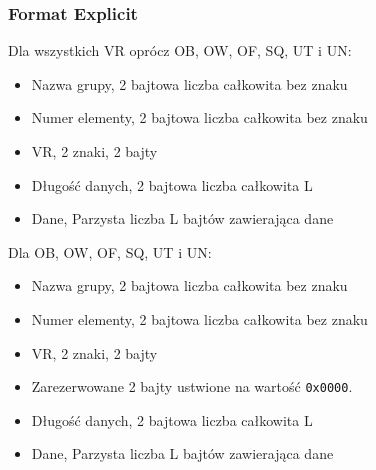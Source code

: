 \documentclass{beamer}
\begin{document}
\begin{frame}[allowframebreaks]
  \frametitle{Format Explicit}

Dla wszystkich VR oprócz OB, OW, OF, SQ, UT i UN:
\begin{itemize}
  \item Nazwa grupy, 2 bajtowa liczba całkowita bez znaku
  \item Numer elementy, 2 bajtowa liczba całkowita bez znaku
  \item VR, 2 znaki, 2 bajty
  \item Długość danych, 2 bajtowa liczba całkowita L
  \item Dane, Parzysta liczba L bajtów zawierająca dane  
\end{itemize}

\framebreak

Dla OB, OW, OF, SQ, UT i UN:
\begin{itemize}
  \item Nazwa grupy, 2 bajtowa liczba całkowita bez znaku
  \item Numer elementy, 2 bajtowa liczba całkowita bez znaku
  \item VR, 2 znaki, 2 bajty
  \item Zarezerwowane 2 bajty ustwione na wartość \texttt{0x0000}.
  \item Długość danych, 2 bajtowa liczba całkowita L
  \item Dane, Parzysta liczba L bajtów zawierająca dane  
\end{itemize}
\end{frame}

\end{document}
